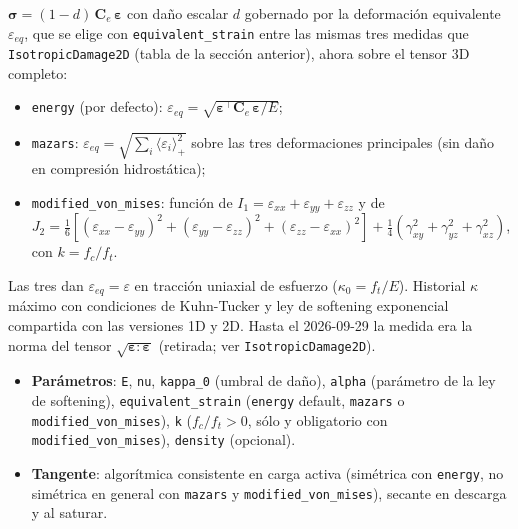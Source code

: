 \documentclass[11pt,oneside]{report}
\begin{document}
$\boldsymbol\sigma = (1-d)\,\mathbf{C}_e\,\boldsymbol\varepsilon$ con daño escalar $d$ gobernado por la deformación equivalente $\varepsilon_{eq}$, que se elige con \texttt{equivalent\_\allowbreak{}strain} entre las mismas tres medidas que \texttt{IsotropicDamage2D} (tabla de la sección anterior), ahora sobre el tensor 3D completo:

\begin{itemize}
  \item \texttt{energy} (por defecto): $\varepsilon_{eq} = \sqrt{\boldsymbol\varepsilon^\top\mathbf C_e\,\boldsymbol\varepsilon/E}$;
  \item \texttt{mazars}: $\varepsilon_{eq} = \sqrt{\sum_i\langle\varepsilon_i\rangle_+^2}$ sobre las tres deformaciones principales (sin daño en compresión hidrostática);
  \item \texttt{modified\_\allowbreak{}von\_\allowbreak{}mises}: función de $I_1 = \varepsilon_{xx} + \varepsilon_{yy} + \varepsilon_{zz}$ y de $J_2 = \tfrac16\left[(\varepsilon_{xx}-\varepsilon_{yy})^2 + (\varepsilon_{yy}-\varepsilon_{zz})^2 + (\varepsilon_{zz}-\varepsilon_{xx})^2\right] + \tfrac14(\gamma_{xy}^2 + \gamma_{yz}^2 + \gamma_{xz}^2)$, con $k = f_c/f_t$.
\end{itemize}

Las tres dan $\varepsilon_{eq} = \varepsilon$ en tracción uniaxial de esfuerzo ($\kappa_0 = f_t/E$). Historial $\kappa$ máximo con condiciones de Kuhn-Tucker y ley de softening exponencial compartida con las versiones 1D y 2D. Hasta el 2026-09-29 la medida era la norma del tensor $\sqrt{\boldsymbol\varepsilon:\boldsymbol\varepsilon}$ (retirada; ver \texttt{IsotropicDamage2D}).

\begin{itemize}
  \item \textbf{Parámetros}: \texttt{E}, \texttt{nu}, \texttt{kappa\_0} (umbral de daño), \texttt{alpha} (parámetro de la ley de softening), \texttt{equivalent\_\allowbreak{}strain} (\texttt{energy} default, \texttt{mazars} o \texttt{modified\_\allowbreak{}von\_\allowbreak{}mises}), \texttt{k} ($f_c/f_t > 0$, sólo y obligatorio con \texttt{modified\_\allowbreak{}von\_\allowbreak{}mises}), \texttt{density} (opcional).
  \item \textbf{Tangente}: algorítmica consistente en carga activa (simétrica con \texttt{energy}, no simétrica en general con \texttt{mazars} y \texttt{modified\_\allowbreak{}von\_\allowbreak{}mises}), secante en descarga y al saturar.
\end{itemize}
\end{document}
